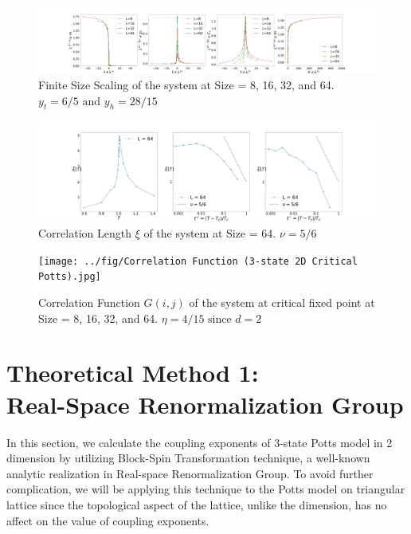 \documentclass[%
 reprint,
 amsmath,amssymb,
 aps,
]{revtex4-2}
\begin{document}
\begin{figure}[b]
\includegraphics[width=1\textwidth]{../fig/Finite Size Scaling (3-state 2D Potts).jpg}
\caption{\label{fig:fss} Finite Size Scaling of the system at Size = 8, 16, 32, and 64. 
$y_{t} = 6/5 \text{ and } y_{h} = 28/15$}
\end{figure}

\begin{figure}[b]
\includegraphics[width=1\textwidth]{../fig/Correlation Length (3-state 2D Potts).jpg}
\caption{\label{fig:corrlength} Correlation Length $\xi$ of the system at Size = 64. 
$\nu = 5/6$}
\end{figure}

\begin{figure}[b]
\texttt{[image: ../fig/Correlation Function (3-state 2D Critical 
Potts).jpg]}
\caption{\label{fig:corrfunc} Correlation Function $G(i,j)$ of the system at critical 
fixed point at Size = 8, 16, 32, and 64. $\eta = 4/15 \text{ since } d = 2$}
\end{figure}

\section{\label{sec:rsrg}Theoretical Method 1: \\ Real-Space Renormalization Group}
In this section, we calculate the coupling exponents of 3-state Potts model in 2 dimension 
by utilizing Block-Spin Transformation technique, a well-known analytic realization in 
Real-space Renormalization Group. To avoid further complication, we will be applying this 
technique to the Potts model on triangular lattice since the topological aspect of the
lattice, unlike the dimension, has no affect on the value of coupling exponents. \\
\end{document}
